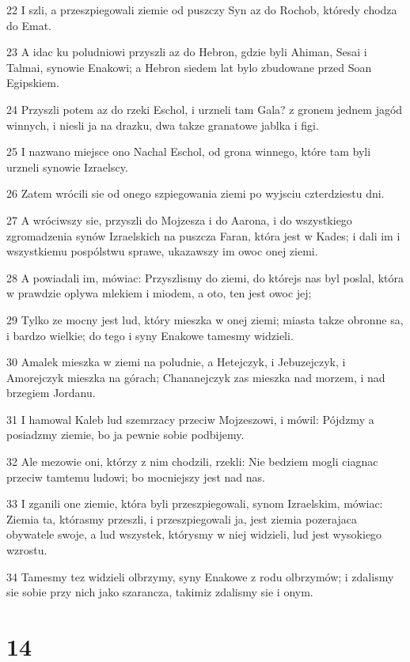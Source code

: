 \par 22 I szli, a przeszpiegowali ziemie od puszczy Syn az do Rochob, któredy chodza do Emat.
\par 23 A idac ku poludniowi przyszli az do Hebron, gdzie byli Ahiman, Sesai i Talmai, synowie Enakowi; a Hebron siedem lat bylo zbudowane przed Soan Egipskiem.
\par 24 Przyszli potem az do rzeki Eschol, i urzneli tam Gala? z gronem jednem jagód winnych, i niesli ja na drazku, dwa takze granatowe jablka i figi.
\par 25 I nazwano miejsce ono Nachal Eschol, od grona winnego, które tam byli urzneli synowie Izraelscy.
\par 26 Zatem wrócili sie od onego szpiegowania ziemi po wyjsciu czterdziestu dni.
\par 27 A wróciwszy sie, przyszli do Mojzesza i do Aarona, i do wszystkiego zgromadzenia synów Izraelskich na puszcza Faran, która jest w Kades; i dali im i wszystkiemu pospólstwu sprawe, ukazawszy im owoc onej ziemi.
\par 28 A powiadali im, mówiac: Przyszlismy do ziemi, do którejs nas byl poslal, która w prawdzie oplywa mlekiem i miodem, a oto, ten jest owoc jej;
\par 29 Tylko ze mocny jest lud, który mieszka w onej ziemi; miasta takze obronne sa, i bardzo wielkie; do tego i syny Enakowe tamesmy widzieli.
\par 30 Amalek mieszka w ziemi na poludnie, a Hetejczyk, i Jebuzejczyk, i Amorejczyk mieszka na górach; Chananejczyk zas mieszka nad morzem, i nad brzegiem Jordanu.
\par 31 I hamowal Kaleb lud szemrzacy przeciw Mojzeszowi, i mówil: Pójdzmy a posiadzmy ziemie, bo ja pewnie sobie podbijemy.
\par 32 Ale mezowie oni, którzy z nim chodzili, rzekli: Nie bedziem mogli ciagnac przeciw tamtemu ludowi; bo mocniejszy jest nad nas.
\par 33 I zganili one ziemie, która byli przeszpiegowali, synom Izraelskim, mówiac: Ziemia ta, którasmy przeszli, i przeszpiegowali ja, jest ziemia pozerajaca obywatele swoje, a lud wszystek, którysmy w niej widzieli, lud jest wysokiego wzrostu.
\par 34 Tamesmy tez widzieli olbrzymy, syny Enakowe z rodu olbrzymów; i zdalismy sie sobie przy nich jako szarancza, takimiz zdalismy sie i onym.

\chapter{14}

